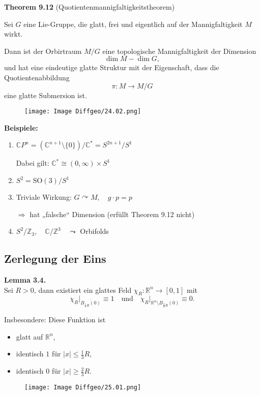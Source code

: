 \documentclass[fleqn, 12pt, letterpaper]{article}
\begin{document}
\textbf{Theorem 9.12} (Quotientenmannigfaltigkeitstheorem)

Sei \( G \) eine Lie-Gruppe, die {glatt}, {frei} und {eigentlich} auf der Mannigfaltigkeit \( M \) wirkt.

Dann ist der Orbirtraum \( M / G \) eine topologische Mannigfaltigkeit der Dimension 
\[
\dim M - \dim G,
\]
und hat eine eindeutige glatte Struktur mit der Eigenschaft, dass die Quotientenabbildung
\[
\pi : M \to M/G
\]
eine {glatte Submersion} ist.
  \begin{figure}[H]
    \centering
    \texttt{[image: Image Diffgeo/24.02.png]}
 \end{figure}

\textbf{Beispiele:}
\begin{enumerate}
  \item \(\mathbb{C}P^n = \left( \mathbb{C}^{n+1} \setminus \{0\} \right) / \mathbb{C}^* 
        = S^{2n+1} / S^1\)
        
        Dabei gilt: \( \mathbb{C}^* \cong (0, \infty) \times S^1 \)

  \item \( S^2 = \mathrm{SO}(3) / S^1 \)
  
  \item {Triviale Wirkung:} \( G \curvearrowright M,\quad g \cdot p = p \)

        \hspace{1em} $\Rightarrow$ hat „falsche“ Dimension (erfüllt Theorem 9.12 nicht)

  \item \( S^2/\mathbb{Z}_3,\quad \mathbb{C}/\mathbb{Z}^3 \quad \leadsto \) {Orbifolds}
\end{enumerate}


\subsection{Zerlegung der Eins}
\textbf{Lemma 3.4.} \\
Sei $R > 0$, dann existiert ein glattes Feld $\chi_R : \mathbb{R}^n \to [0,1]$ mit
\[
\chi_R \big|_{\overline{B_{\frac{1}{3}R}(0)}} \equiv 1
\quad \text{und} \quad
\chi_R \big|_{\mathbb{R}^n \setminus B_{\frac{2}{3}R}(0)} \equiv 0.
\]

{Insbesondere:} Diese Funktion ist
\begin{itemize}
    \item glatt auf $\mathbb{R}^n$,
    \item identisch $1$ für $|x| \leq \frac{1}{3}R$,
    \item identisch $0$ für $|x| \geq \frac{2}{3}R$.
\end{itemize}
      \begin{figure}[H]
    \centering
    \texttt{[image: Image Diffgeo/25.01.png]}
 \end{figure}
\end{document}
